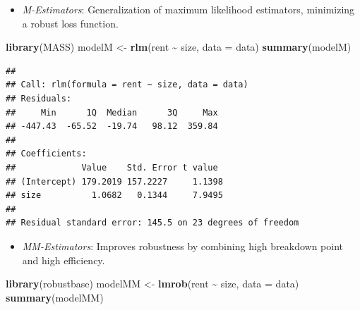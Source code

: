 \documentclass[
]{article}
\newenvironment{Shaded}{\begin{snugshade}}{\end{snugshade}}
\newcommand{\AttributeTok}[1]{\textcolor[rgb]{0.13,0.29,0.53}{#1}}
\newcommand{\FunctionTok}[1]{\textcolor[rgb]{0.13,0.29,0.53}{\textbf{#1}}}
\newcommand{\NormalTok}[1]{#1}
\newcommand{\OtherTok}[1]{\textcolor[rgb]{0.56,0.35,0.01}{#1}}
\newcommand{\SpecialCharTok}[1]{\textcolor[rgb]{0.81,0.36,0.00}{\textbf{#1}}}
\providecommand{\tightlist}{%
  \setlength{\itemsep}{0pt}\setlength{\parskip}{0pt}}
\begin{document}
\begin{itemize}
\tightlist
\item
  \emph{M-Estimators}: Generalization of maximum likelihood estimators,
  minimizing a robust loss function.
\end{itemize}

\begin{Shaded}
\begin{Highlighting}[]
\FunctionTok{library}\NormalTok{(MASS)}
\NormalTok{modelM }\OtherTok{\textless{}{-}} \FunctionTok{rlm}\NormalTok{(rent }\SpecialCharTok{\textasciitilde{}}\NormalTok{ size, }\AttributeTok{data =}\NormalTok{ data)}
\FunctionTok{summary}\NormalTok{(modelM)}
\end{Highlighting}
\end{Shaded}

\begin{verbatim}
## 
## Call: rlm(formula = rent ~ size, data = data)
## Residuals:
##     Min      1Q  Median      3Q     Max 
## -447.43  -65.52  -19.74   98.12  359.84 
## 
## Coefficients:
##             Value    Std. Error t value 
## (Intercept) 179.2019 157.2227     1.1398
## size          1.0682   0.1344     7.9495
## 
## Residual standard error: 145.5 on 23 degrees of freedom
\end{verbatim}

\begin{itemize}
\tightlist
\item
  \emph{MM-Estimators}: Improves robustness by combining high breakdown
  point and high efficiency.
\end{itemize}

\begin{Shaded}
\begin{Highlighting}[]
\FunctionTok{library}\NormalTok{(robustbase)}
\NormalTok{modelMM }\OtherTok{\textless{}{-}} \FunctionTok{lmrob}\NormalTok{(rent }\SpecialCharTok{\textasciitilde{}}\NormalTok{ size, }\AttributeTok{data =}\NormalTok{ data)}
\FunctionTok{summary}\NormalTok{(modelMM)}
\end{Highlighting}
\end{Shaded}
\end{document}
